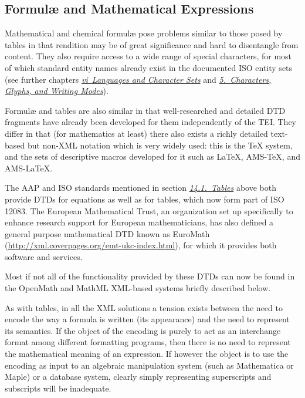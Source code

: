 \subsection[{Formulæ and Mathematical Expressions}]{Formulæ and Mathematical Expressions}\label{FTFOR}\par
Mathematical and chemical formulæ pose problems similar to those posed by tables in that rendition may be of great significance and hard to disentangle from content. They also require access to a wide range of special characters, for most of which standard entity names already exist in the documented ISO entity sets (see further chapters \textit{\hyperref[CH]{vi\ Languages and Character Sets}} and \textit{\hyperref[WD]{5.\ Characters, Glyphs, and Writing Modes}}).\par
Formulæ and tables are also similar in that well-researched and detailed DTD fragments have already been developed for them independently of the TEI. They differ in that (for mathematics at least) there also exists a richly detailed text-based but non-XML notation which is very widely used: this is the TeX system, and the sets of descriptive macros developed for it such as LaTeX, AMS-TeX, and AMS-LaTeX. \par
The AAP and ISO standards mentioned in section \textit{\hyperref[FTTAB]{14.1.\ Tables}} above both provide DTDs for equations as well as for tables, which now form part of ISO 12083. The European Mathematical Trust, an organization set up specifically to enhance research support for European mathematicians, has also defined a general purpose mathematical DTD known as EuroMath (\url{http://xml.coverpages.org/emt-ukc-index.html}), for which it provides both software and services.\par
Most if not all of the functionality provided by these DTDs can now be found in the OpenMath and MathML XML-based systems briefly described below. \par
As with tables, in all the XML solutions a tension exists between the need to encode the way a formula is written (its appearance) and the need to represent its semantics. If the object of the encoding is purely to act as an interchange format among different formatting programs, then there is no need to represent the mathematical meaning of an expression. If however the object is to use the encoding as input to an algebraic manipulation system (such as Mathematica or Maple) or a database system, clearly simply representing superscripts and subscripts will be inadequate. \par

